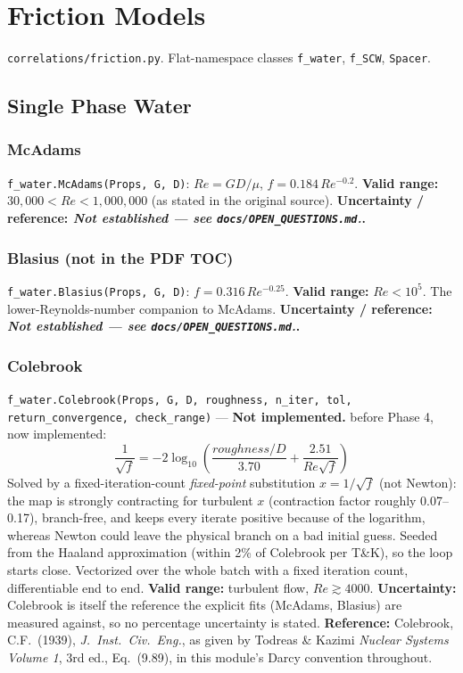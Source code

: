 \documentclass[11pt]{article}
\newcommand{\code}[1]{\texttt{#1}}
\newcommand{\notimpl}{\textbf{Not implemented.}}
\newcommand{\notest}{\textit{Not established --- see \code{docs/OPEN\_QUESTIONS.md}.}}
\begin{document}
\section{Friction Models}

\code{correlations/friction.py}. Flat-namespace classes \code{f\_water}, \code{f\_SCW},
\code{Spacer}.

\subsection{Single Phase Water}

\subsubsection{McAdams}

\code{f\_water.McAdams(Props, G, D)}: $Re=GD/\mu$, $f=0.184\,Re^{-0.2}$.
\textbf{Valid range:} $30{,}000<Re<1{,}000{,}000$ (as stated in the original source).
\textbf{Uncertainty / reference: \notest{}.}

\subsubsection*{Blasius (not in the PDF TOC)}

\code{f\_water.Blasius(Props, G, D)}: $f=0.316\,Re^{-0.25}$. \textbf{Valid range:}
$Re<10^5$. The lower-Reynolds-number companion to McAdams. \textbf{Uncertainty /
reference: \notest{}.}

\subsubsection{Colebrook}

\code{f\_water.Colebrook(Props, G, D, roughness, n\_iter, tol, return\_convergence,
check\_range)} --- \notimpl{} before Phase 4, now implemented:
\[
  \frac{1}{\sqrt{f}} = -2\log_{10}\left(\frac{roughness/D}{3.70} + \frac{2.51}{Re\sqrt{f}}\right)
\]
Solved by a fixed-iteration-count \emph{fixed-point} substitution $x=1/\sqrt f$ (not
Newton): the map is strongly contracting for turbulent $x$ (contraction factor roughly
0.07--0.17), branch-free, and keeps every iterate positive because of the logarithm,
whereas Newton could leave the physical branch on a bad initial guess. Seeded from the
Haaland approximation (within 2\% of Colebrook per T\&K), so the loop starts close.
Vectorized over the whole batch with a fixed iteration count, differentiable end to
end. \textbf{Valid range:} turbulent flow, $Re\gtrsim4000$. \textbf{Uncertainty:}
Colebrook is itself the reference the explicit fits (McAdams, Blasius) are measured
against, so no percentage uncertainty is stated. \textbf{Reference:} Colebrook, C.F.\
(1939), \emph{J.\ Inst.\ Civ.\ Eng.}, as given by Todreas \& Kazimi \emph{Nuclear
Systems Volume 1}, 3rd ed., Eq.\ (9.89), in this module's Darcy convention throughout.
\end{document}
